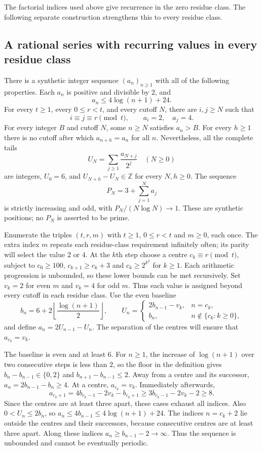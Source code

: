 \documentclass[11pt]{article}
\begin{document}
The factorial indices used above give recurrence in the zero residue class.
The following separate construction strengthens this to every residue class.


\subsection{A rational series with recurring values in every residue class}
\label{long251:res:all-residue-log-countermodel}
There is a synthetic integer sequence $(a_n)_{n\ge1}$ with all of the
following properties.  Each $a_n$ is positive and divisible by $2$, and
\[
 a_n\le 4\log(n+1)+24.
\]
For every $t\ge1$, every $0\le r<t$, and every cutoff $N$, there are
$i,j\ge N$ such that
\[
 i\equiv j\equiv r\pmod t,\qquad a_i=2,\quad a_j=4.
\]
For every integer $B$ and cutoff $N$, some $n\ge N$ satisfies $a_n>B$.
For every $h\ge1$ there is no cutoff after which $a_{n+h}=a_n$ for all $n$.
Nevertheless, all the complete tails
\[
 U_N=\sum_{j\ge1}\frac{a_{N+j}}{2^j}\quad(N\ge0)
\]
are integers, $U_0=6$, and $U_{N+h}-U_N\in\mathbb Z$ for every $N,h\ge0$.
The sequence
\[
 P_N=3+\sum_{j=1}^{N}a_j
\]
is strictly increasing and odd, with $P_N/(N\log N)\to1$.
These are synthetic positions; no $P_N$ is asserted to be prime.

Enumerate the triples $(t,r,m)$ with $t\ge1$, $0\le r<t$ and $m\ge0$,
each once.  The extra index $m$ repeats each residue-class requirement
infinitely often; its parity will select the value $2$ or $4$.
At the $k$th step choose a centre $c_k\equiv r\pmod t$, subject to
$c_0\ge100$, $c_{k+1}\ge c_k+3$ and $c_k\ge2^{k^2}$ for $k\ge1$.
Each arithmetic progression is unbounded, so these lower bounds can be
met recursively.  Set $v_k=2$ for even $m$ and $v_k=4$ for odd $m$.
Thus each value is assigned beyond every cutoff in each residue class.
Use the even baseline
\[
 b_n=6+2\left\lfloor\frac{\log(n+1)}2\right\rfloor,
 \qquad
 U_n=\begin{cases}2b_{n-1}-v_k,&n=c_k,\\b_n,&n\notin\{c_k:k\ge0\},\end{cases}
\]
and define $a_n=2U_{n-1}-U_n$.  The separation of the centres will ensure
that $a_{c_k}=v_k$.

The baseline is even and at least $6$.  For $n\ge1$, the increase of
$\log(n+1)$ over two consecutive steps is less than $2$, so the floor
in the definition gives $b_n-b_{n-1}\in\{0,2\}$ and
$b_{n+1}-b_{n-1}\le2$.  Away from a centre and its successor,
$a_n=2b_{n-1}-b_n\ge4$.  At a centre, $a_{c_k}=v_k$.
Immediately afterwards,
\[
 a_{c_k+1}=4b_{c_k-1}-2v_k-b_{c_k+1}
 \ge3b_{c_k-1}-2v_k-2\ge8.
\]
Since the centres are at least three apart, these cases exhaust all
indices.  Also $0<U_n\le2b_n$, so
$a_n\le4b_{n-1}\le4\log(n+1)+24$.
The indices $n=c_k+2$ lie outside the centres and their successors,
because consecutive centres are at least three apart.  Along these
indices $a_n\ge b_{n-1}-2\to\infty$.  Thus the sequence is unbounded
and cannot be eventually periodic.
\end{document}
